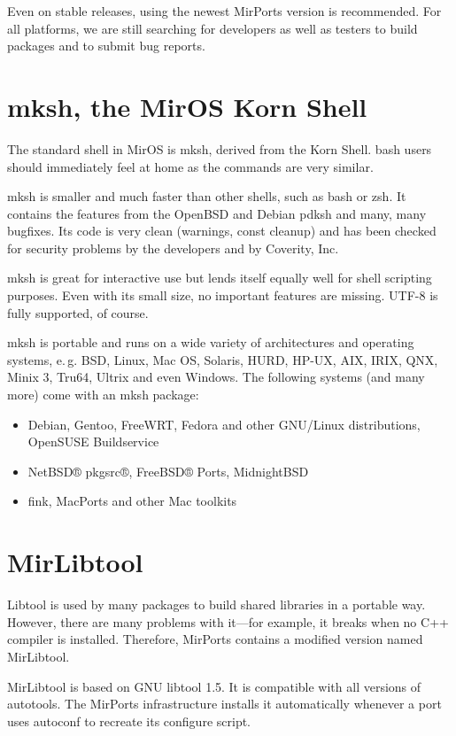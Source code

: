 \documentclass[a4paper,landscape,11pt,notumble]{leaflet}
\begin{document}
Even on stable releases, using the newest MirPorts version is recommended. For all platforms, we are still searching for developers as well as testers to build packages and to submit bug reports.

\newpage

\section{mksh, the MirOS Korn Shell}

The standard shell in MirOS is mksh, derived from the Korn Shell. bash users should immediately feel at home as the commands are very similar.

mksh is smaller and much faster than other shells, such as bash or zsh. It contains the features from the OpenBSD and Debian pdksh and many, many bugfixes. Its code is very clean (warnings, const cleanup) and has been checked for security problems by the developers and by Coverity, Inc.

mksh is great for interactive use but lends itself equally well for shell scripting purposes. Even with its small size, no important features are missing. UTF-8 is fully supported, of course.

mksh is portable and runs on a wide variety of architectures and operating systems, e.\,g. BSD, Linux, Mac OS, Solaris, HURD, HP-UX, AIX, IRIX, QNX, Minix 3, Tru64, Ultrix and even Windows. The following systems (and many more) come with an mksh package:

\begin{itemize}
\item Debian, Gentoo, FreeWRT, Fedora and other GNU/Linux distributions, OpenSUSE Buildservice
\item NetBSD® pkgsrc®, FreeBSD® Ports, MidnightBSD
\item fink, MacPorts and other Mac toolkits
\end{itemize}

\section{MirLibtool}

Libtool is used by many packages to build shared libraries in  a portable way. However, there are many problems with it—for example, it breaks when no C++ compiler is installed. Therefore, MirPorts contains a modified version named MirLibtool.

MirLibtool is based on GNU libtool 1.5. It is compatible with all versions of autotools. The MirPorts infrastructure installs it automatically whenever a port uses autoconf to recreate its configure script.
\end{document}
